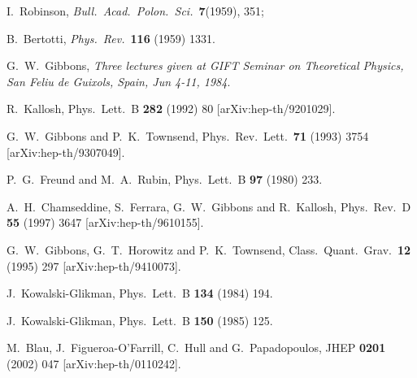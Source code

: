 \documentclass[12pt,a4paper]{article}
\begin{document}
\begin{thebibliography}{40}
 I.~Robinson,
                 {\it Bull.~Acad.~Polon.~Sci.}~\textbf{7}(1959), 351;
               
 B.~Bertotti,
                  {\it Phys.~Rev.}~\textbf{116} (1959) 1331.

G.~W.~Gibbons,
{\it Three lectures given at GIFT Seminar on Theoretical Physics, San Feliu de Guixols, Spain, Jun 4-11, 1984}.

R.~Kallosh,
Phys.\ Lett.\ B {\bf 282} (1992) 80
[arXiv:hep-th/9201029].

G.~W.~Gibbons and P.~K.~Townsend,
Phys.\ Rev.\ Lett.\  {\bf 71} (1993) 3754
[arXiv:hep-th/9307049].

P.~G.~Freund and M.~A.~Rubin,
Phys.\ Lett.\ B {\bf 97} (1980) 233.

A.~H.~Chamseddine, S.~Ferrara, G.~W.~Gibbons and R.~Kallosh,
Phys.\ Rev.\ D {\bf 55} (1997) 3647
[arXiv:hep-th/9610155].

G.~W.~Gibbons, G.~T.~Horowitz and P.~K.~Townsend,
Class.\ Quant.\ Grav.\  {\bf 12} (1995) 297
[arXiv:hep-th/9410073].

J.~Kowalski-Glikman,
Phys.\ Lett.\ B {\bf 134} (1984) 194.

J.~Kowalski-Glikman,
Phys.\ Lett.\ B {\bf 150} (1985) 125.

M.~Blau, J.~Figueroa-O'Farrill, C.~Hull and G.~Papadopoulos,
JHEP {\bf 0201} (2002) 047
[arXiv:hep-th/0110242].


\end{thebibliography}
\end{document}
